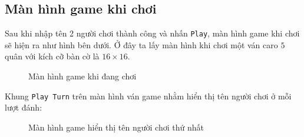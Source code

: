 \subsection{Màn hình game khi chơi}
Sau khi nhập tên 2 người chơi thành công và nhấn \verb|Play|, màn hình game khi chơi sẽ hiện ra như hình bên dưới. Ở đây ta lấy màn hình khi chơi một ván caro \(5\) quân với kích cỡ bàn cờ là \(16 \times 16\).
\begin{figure}[H]
\caption{Màn hình game khi đang chơi}
\end{figure}
Khung \verb|Play Turn| trên màn hình ván game nhằm hiển thị tên người chơi ở mỗi lượt đánh:
\begin{figure}[H]
\caption{Màn hình game hiển thị tên người chơi thứ nhất}
\end{figure}
